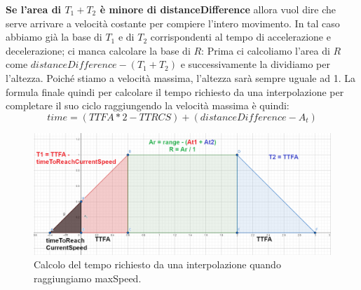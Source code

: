 \documentclass[main.tex]{subfiles}
\begin{document}
\textbf{Se l'area di $T_1 + T_2$ è minore di distanceDifference} allora vuol dire che serve arrivare a velocità costante per compiere l'intero movimento. In tal caso abbiamo già la base di $T_1$ e di $T_2$ corrispondenti al tempo di accelerazione e decelerazione; ci manca calcolare la base di $R$: Prima ci calcoliamo l'area di $R$ come $distanceDifference - (T_1 + T_2)$ e successivamente la dividiamo per l'altezza. Poiché stiamo a velocità massima, l'altezza sarà sempre uguale ad 1. La formula finale quindi per calcolare il tempo richiesto da una interpolazione per completare il suo ciclo raggiungendo la velocità massima è quindi:
\[time = (TTFA * 2 - TTRCS) + (distanceDifference - A_t)\]
\begin{figure}[H]
    \centering
    \includegraphics[width=1\linewidth]{img/interpolazione/speedCapTotalAreaCalc.png}
    \caption{Calcolo del tempo richiesto da una interpolazione quando raggiungiamo maxSpeed.}
    \label{fig:4_speedCapTotalAreaCalc}
\end{figure}
\end{document}
